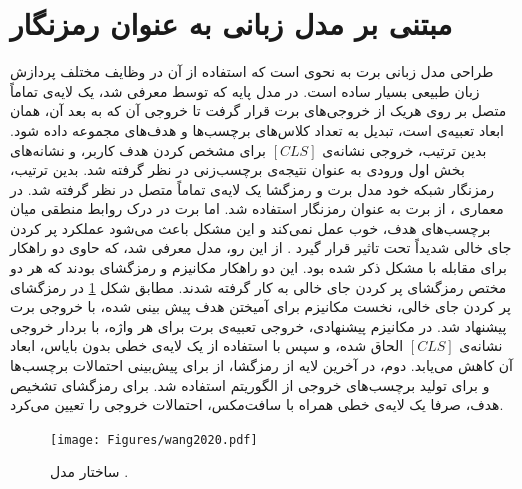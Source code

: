 \section{مبتنی بر مدل زبانی به عنوان رمزنگار}
طراحی مدل زبانی برت به نحوی است که استفاده از آن در وظایف مختلف پردازش زبان طبیعی بسیار ساده است. در مدل پایه که توسط \cite{chen:2019} معرفی شد، یک لایه‌ی تماماً متصل بر روی هریک از خروجی‌های برت قرار گرفت تا خروجی آن که به بعد آن، همان ابعاد تعبیه‌ی است، تبدیل به تعداد کلاس‌های برچسب‌ها و هدف‌های مجموعه داده شود. بدین ترتیب، خروجی نشانه‌ی $[CLS]$ برای مشخص کردن هدف کاربر، و نشانه‌های بخش اول ورودی به عنوان نتیجه‌ی برچسب‌زنی در نظر گرفته شد. بدین ترتیب، رمزنگار شبکه خود مدل برت و رمزگشا یک لایه‌ی تماماً متصل در نظر گرفته شد.
در معماری \cite{chen:2019}، از برت به عنوان رمزنگار استفاده شد. اما برت در درک روابط منطقی میان برچسب‌های هدف، خوب عمل نمی‌کند و این مشکل باعث می‌شود عملکرد پر کردن جای خالی شدیداً تحت تاثیر قرار گیرد \cite{Wang:2020}. از این رو، مدل  \cite{Wang:2020} معرفی شد، که حاوی دو راهکار برای مقابله با مشکل ذکر شده  بود. این دو راهکار مکانیزم  و رمزگشای  بودند که هر دو مختص رمزگشای پر کردن جای خالی به کار گرفته شدند. مطابق شکل \ref{Fig:wang2020} در رمزگشای پر کردن جای خالی، نخست مکانیزم  برای آمیختن هدف پیش بینی شده، با خروجی برت پیشنهاد شد. در مکانیزم  پیشنهادی، خروجی تعبیه‌ی برت برای هر واژه، با بردار خروجی نشانه‌ی $[CLS]$ الحاق شده، و سپس با استفاده از یک لایه‌ی خطی بدون بایاس، ابعاد آن کاهش می‌یابد. دوم، در آخرین لایه از رمزگشا، از  برای پیش‌بینی احتمالات برچسب‌ها و برای تولید برچسب‌های خروجی از الگوریتم  استفاده شد. برای رمزگشای تشخیص هدف، صرفا یک لایه‌ی خطی همراه با سافت‌مکس، احتمالات خروجی را تعیین می‌کرد.
\begin{figure}[!htb]
	\centering
	\texttt{[image: Figures/wang2020.pdf]}
	\caption[ساختار مدل ]{ساختار مدل  \cite{Wang:2020}.}
	\label{Fig:wang2020}
\end{figure}
